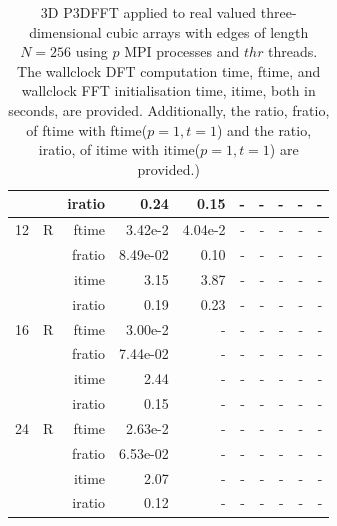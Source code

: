 \documentclass[a4paper]{article}
\begin{document}
\begin{table}[htbp]
\begin{center}
\begin{small}
\begin{tabular}{|r|r|r|r|r|r|r|r|r|r|}
             &             &  iratio &    0.24 &    0.15 &      - &      - &      - &      - &      - \\\hline
   12 &   R &   ftime &    3.42e-2 &    4.04e-2 &      - &      - &      - &      - &      - \\
             &             &  fratio &    8.49e-02 &   0.10 &      - &      - &      - &      - &      - \\
             &             &  itime &    3.15  &    3.87  &      - &      - &      - &      - &      - \\
             &             &  iratio &   0.19 &    0.23 &      - &      - &      - &      - &      - \\\hline
   16 &   R &   ftime &    3.00e-2 &      - &      - &      - &      - &      - &      - \\
             &             &  fratio &    7.44e-02 &     - &      - &      - &      - &      - &      - \\
             &             &  itime &    2.44  &      - &      - &      - &      - &      - &      - \\
             &             &  iratio &    0.15 &      - &      - &      - &      - &      - &      - \\\hline
   24 &   R &   ftime &    2.63e-2 &      - &      - &      - &      - &      - &      - \\
             &             &  fratio &    6.53e-02 &     - &      - &      - &      - &      - &      - \\
             &             &  itime &    2.07  &      - &      - &      - &      - &      - &      - \\
             &             &  iratio &    0.12 &      - &      - &      - &      - &      - &      - \\\hline


\end{tabular}
\caption{3D P3DFFT applied to real valued three-dimensional cubic arrays with edges of length $N=256$ using $p$ MPI processes and $thr$ threads. The wallclock DFT computation time, ftime, and wallclock FFT initialisation time, itime, both in seconds, are provided. Additionally, the ratio, fratio, of ftime  with ftime($p=1,t=1$) and the ratio, iratio, of itime  with itime($p=1,t=1$) are provided.) }\label{Tbl:P3DFFT3d256}
\end{small}
\end{center}
\end{table}
\end{document}

